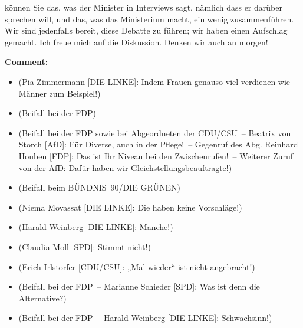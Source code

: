 \documentclass{article}
\begin{document}
können Sie das, was der Minister in Interviews sagt, nämlich dass er darüber sprechen will, und das, was das Ministerium macht, ein wenig zusammenführen. Wir sind jedenfalls bereit, diese Debatte zu führen; wir haben einen Aufschlag gemacht. Ich freue mich auf die Diskussion. Denken wir auch an morgen!   

\noindent\textbf{Comment:}
\begin{itemize}
    \setlength\itemsep{-3pt}
    \item (Pia Zimmermann [DIE LINKE]: Indem Frauen genauso viel verdienen wie Männer zum Beispiel!)
    \setlength\itemsep{-3pt}
    \item (Beifall bei der FDP)
    \setlength\itemsep{-3pt}
    \item (Beifall bei der FDP sowie bei Abgeordneten der CDU/CSU – Beatrix von Storch [AfD]: Für Diverse, auch in der Pflege! – Gegenruf des Abg. Reinhard Houben [FDP]: Das ist Ihr Niveau bei den Zwischenrufen! – Weiterer Zuruf von der AfD: Dafür haben wir Gleichstellungsbeauftragte!)
    \setlength\itemsep{-3pt}
    \item (Beifall beim BÜNDNIS 90/DIE GRÜNEN)
    \setlength\itemsep{-3pt}
    \item (Niema Movassat [DIE LINKE]: Die haben keine Vorschläge!)
    \setlength\itemsep{-3pt}
    \item (Harald Weinberg [DIE LINKE]: Manche!)
    \setlength\itemsep{-3pt}
    \item (Claudia Moll [SPD]: Stimmt nicht!)
    \setlength\itemsep{-3pt}
    \item (Erich Irlstorfer [CDU/CSU]: „Mal wieder“ ist nicht angebracht!)
    \setlength\itemsep{-3pt}
    \item (Beifall bei der FDP – Marianne Schieder [SPD]: Was ist denn die Alternative?)
    \setlength\itemsep{-3pt}
    \item (Beifall bei der FDP – Harald Weinberg [DIE LINKE]: Schwachsinn!)
\end{itemize}
\end{document}
